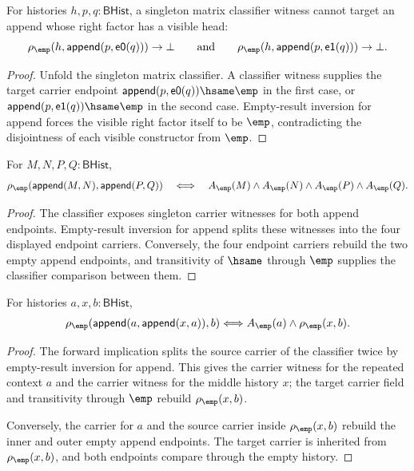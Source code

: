 \begin{theorem}
\label{thm:matrix-singleton-classifier-append-visible-right-absurd}
For histories $h,p,q:\mathsf{BHist}$, a singleton matrix classifier witness
cannot target an append whose right factor has a visible head:
$$
\rho_{\emp}(h,\mathsf{append}(p,\mathsf{e0}(q)))\to\bot
\qquad\text{and}\qquad
\rho_{\emp}(h,\mathsf{append}(p,\mathsf{e1}(q)))\to\bot.
$$
\end{theorem}
\begin{proof}
Unfold the singleton matrix classifier. A classifier witness supplies the
target carrier endpoint
$\mathsf{append}(p,\mathsf{e0}(q))\hsame\emp$ in the first case, or
$\mathsf{append}(p,\mathsf{e1}(q))\hsame\emp$ in the second case. Empty-result
inversion for append forces the visible right factor itself to be $\emp$,
contradicting the disjointness of each visible constructor from $\emp$.
\end{proof}

\begin{theorem}
\label{thm:matrix-singleton-classifier-append-pair-carrier}
For $M,N,P,Q:\mathsf{BHist}$,
$$
\rho_{\emp}(\mathsf{append}(M,N),\mathsf{append}(P,Q))
\quad\Longleftrightarrow\quad
A_{\emp}(M)\land A_{\emp}(N)\land A_{\emp}(P)\land A_{\emp}(Q).
$$
\end{theorem}
\begin{proof}
The classifier exposes singleton carrier witnesses for both append endpoints.
Empty-result inversion for append splits these witnesses into the four displayed
endpoint carriers. Conversely, the four endpoint carriers rebuild the two empty
append endpoints, and transitivity of $\hsame$ through $\emp$ supplies the
classifier comparison between them.
\end{proof}

\begin{theorem}
\label{thm:matrix-singleton-classifier-self-context-split}
For histories $a,x,b:\mathsf{BHist}$,
$$
\rho_{\emp}(\mathsf{append}(a,\mathsf{append}(x,a)),b)
\Longleftrightarrow
A_{\emp}(a)\land\rho_{\emp}(x,b).
$$
\end{theorem}
\begin{proof}
The forward implication splits the source carrier of the classifier twice by
empty-result inversion for append. This gives the carrier witness for the
repeated context $a$ and the carrier witness for the middle history $x$; the
target carrier field and transitivity through $\emp$ rebuild
$\rho_{\emp}(x,b)$.

Conversely, the carrier for $a$ and the source carrier inside
$\rho_{\emp}(x,b)$ rebuild the inner and outer empty append endpoints. The
target carrier is inherited from $\rho_{\emp}(x,b)$, and both endpoints compare
through the empty history.
\end{proof}

